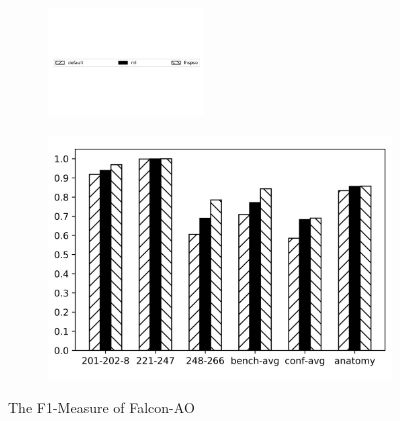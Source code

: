 \documentclass[twoside]{article}
\begin{document}
\begin{figure}[htb!]
\centering
\begin{subfigure}{\textwidth}
\centering
\includegraphics[width=0.45\textwidth]{figures/t_legend.pdf}
\end{subfigure}

\begin{subfigure}{0.5\textwidth}
	\centering
	\includegraphics[width=\textwidth]{data_figs/MulRegress_Falcon_AO_F1.pdf}
\end{subfigure}
\caption{The F1-Measure of Falcon-AO}
\label{fig:MultiRegress_Falcon-AO_F1-Measure}
\end{figure}
\end{document}
